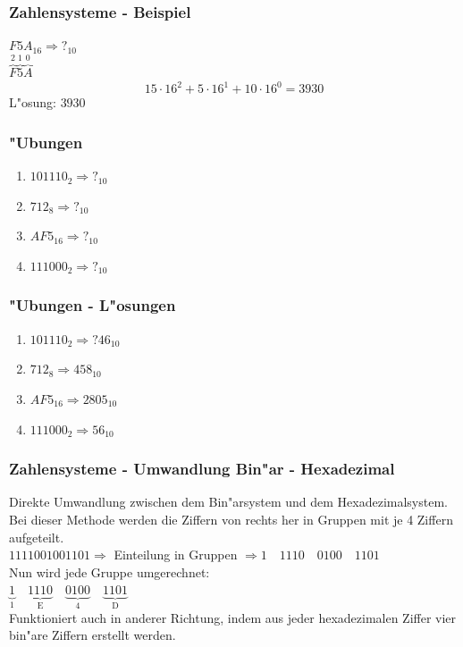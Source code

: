 \documentclass{beamer}
\begin{document}
\frame
{
	\frametitle{Zahlensysteme - Beispiel}
	$F5A_{16} \Rightarrow ?_{10}$\\
	\vspace{3mm}
	$\overbrace{F}^\text{2} \overbrace{5}^\text{1} \overbrace{A}^\text{0}$
	\vspace{3mm}
	\begin{displaymath}
	15 \cdot 16^2 + 5 \cdot 16^1 + 10 \cdot 16^0 = 3930
	\end{displaymath}
	\vspace{3mm}
	L"osung: $3930$
}

\frame
{
	\frametitle{"Ubungen}
	\begin{enumerate}
	\item $101110_{2} \Rightarrow ?_{10}$
	\item $712_{8} \Rightarrow ?_{10}$
	\item $AF5_{16} \Rightarrow ?_{10}$
	\item $111000_{2} \Rightarrow ?_{10}$
	\end{enumerate}
}

\frame
{
	\frametitle{"Ubungen - L"osungen}
	\begin{enumerate}
	\item $101110_{2} \Rightarrow ?46_{10}$
	\item $712_{8} \Rightarrow 458_{10}$
	\item $AF5_{16} \Rightarrow 2805_{10}$
	\item $111000_{2} \Rightarrow 56_{10}$
	\end{enumerate}
}

\frame
{
	\frametitle{Zahlensysteme - Umwandlung Bin"ar - Hexadezimal}
	Direkte Umwandlung zwischen dem Bin"arsystem und dem Hexadezimalsystem.\\
	Bei dieser Methode werden die Ziffern von rechts her in Gruppen mit
	je 4 Ziffern aufgeteilt.\\
	{\small
	$1111001001101 \Rightarrow$ Einteilung in Gruppen $\Rightarrow 1 \quad 1110 \quad 0100 \quad 1101$
	}\\
	\vspace{3mm}
	Nun wird jede Gruppe umgerechnet:\\
	\vspace{3mm}
	$\underbrace{1}_\text{1} \quad \underbrace{1110}_\text{E} \quad \underbrace{0100}_\text{4} \quad \underbrace{1101}_\text{D}$\\
	\vspace{3mm}
	Funktioniert auch in anderer Richtung, indem aus jeder hexadezimalen Ziffer vier bin"are Ziffern erstellt werden.
}
\end{document}
